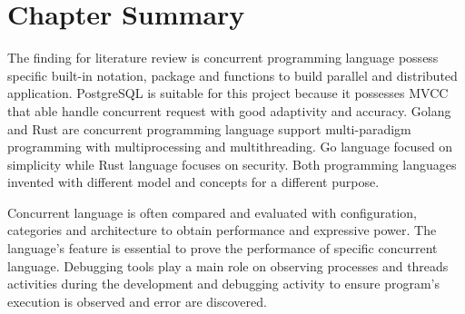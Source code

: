 \section{Chapter Summary}

The finding for literature review is concurrent programming language possess specific built-in notation, package and functions to build parallel and distributed application. PostgreSQL is suitable for this project because it possesses MVCC that able handle concurrent request with good adaptivity and accuracy. Golang and Rust are concurrent programming language support multi-paradigm programming with multiprocessing and multithreading. Go language focused on simplicity while Rust language focuses on security. Both programming languages invented with different model and concepts for a different purpose.

Concurrent language is often compared and evaluated with configuration, categories and architecture to obtain performance and expressive power. The language's feature is essential to prove the performance of specific concurrent language. Debugging tools play a main role on observing processes and threads activities during the development and debugging activity to ensure program's execution is observed and error are discovered. 

